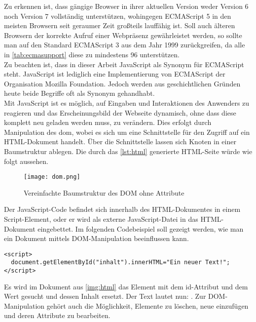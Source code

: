 Zu erkennen ist, dass gängige Browser in ihrer aktuellen Version weder Version 6 noch Version 7 vollständig unterstützen, wohingegen ECMAScript 5 in den meisten Browsern seit geraumer Zeit großteils lauffähig ist. Soll auch älteren Browsern der korrekte Aufruf einer Webpräsenz gewährleistet werden, so sollte man auf den Standard ECMAScript 3 aus dem Jahr 1999 zurückgreifen, da alle in \autoref{tab:ecmasupport} diese zu mindestens 96 \percent unterstützen.\\
Zu beachten ist, dass in dieser Arbeit JavaScript als Synonym für ECMAScript steht. JavaScript ist lediglich eine Implementierung von ECMAScript der Organisation Mozilla Foundation. Jedoch werden aus geschichtlichen Gründen heute beide Begriffe oft als Synonym gehandhabt.\\
Mit JavaScript ist es möglich, auf Eingaben und Interaktionen des Anwenders zu reagieren und das Erscheinungsbild der Webseite dynamisch, ohne dass diese komplett neu geladen werden muss, zu verändern. Dies erfolgt durch Manipulation des \ac{dom}, wobei es sich um eine Schnittstelle für den Zugriff auf ein HTML-Dokument handelt. Über die Schnittstelle lassen sich Knoten in einer Baumstruktur ablegen. Die durch das \autoref{lst:html} generierte HTML-Seite würde wie folgt aussehen.
\begin{figure}[H]
    \begin{center}
        \texttt{[image: dom.png]}
        \caption{Vereinfachte Baumstruktur des DOM ohne Attribute}
        \label{img:dom}
    \end{center}
\end{figure}

Der JavaScript-Code befindet sich innerhalb des HTML-Dokumentes in einem Script-Element, oder er wird als externe JavaScript-Datei in das HTML-Dokument eingebettet. Im folgenden Codebeispiel soll gezeigt werden, wie man ein Dokument mittels DOM-Manipulation beeinflussen kann.

\begin{lstlisting}[style=htmlcssjs, caption=Ein JavaScript Beispiel, label=lst:javascript]
<script>
  document.getElementById("inhalt").innerHTML="Ein neuer Text!";
</script>
\end{lstlisting}

Es wird im Dokument aus \autoref{img:html} das Element mit dem id-Attribut und dem Wert  gesucht und dessen Inhalt ersetzt. Der Text  lautet nun: . Zur DOM-Manipulation gehört auch die Möglichkeit, Elemente zu löschen, neue einzufügen und deren Attribute zu bearbeiten.\\